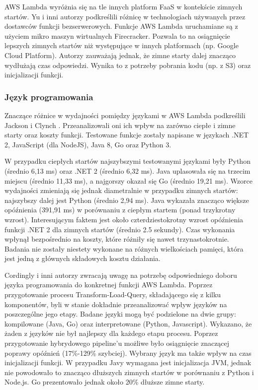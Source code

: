 AWS Lambda wyróżnia się na tle innych platform FaaS w kontekście zimnych startów.
Yu i inni autorzy \cite{10.1145/3419111.3421280} podkreślili różnicę w technologiach używanych przez dostawców funkcji bezserwerowych.
Funkcje AWS Lambda uruchamiane są z użyciem mikro maszyn wirtualnych Firecracker.
Pozwala to na osiągnięcie lepszych zimnych startów niż występujące w innych platformach (np. Google Cloud Platform).
Autorzy zauważają jednak, że zimne starty dalej znacząco wydłużają czas odpowiedzi.
Wynika to z potrzeby pobrania kodu (np. z S3) oraz inicjalizacji funkcji.

\subsubsection*{Język programowania}

Znaczące różnice w wydajności pomiędzy językami w AWS Lambda podkreślili Jackson i Clynch  \cite{8605773}. Przeanalizowali oni ich wpływ na zarówno ciepłe i zimne starty oraz koszty funkcji. Testowane funkcje zostały napisane w językach .NET 2, JavaScript (dla NodeJS), Java 8, Go oraz Python 3. 

W przypadku ciepłych startów najszybszymi testowanymi językami były Python (średnio 6,13 ms) oraz  .NET 2 (średnio 6,32 ms). 
Java uplasowała się na trzecim miejscu (średnio 11,33 ms), a najgorszy okazał się Go (średnio 19,21 ms). 
Wzorce wydajności zmieniają się jednak diametralnie w przypadku zimnych startów: najszybszy dalej jest Python (średnio 2,94 ms). 
Java wykazała znacząco większe opóźnienia (391,91 ms) w porównaniu z ciepłym startem (ponad trzykrotny wzrost). 
Interesującym faktem jest około czterdziestokrotny wzrost opóźnienia funkcji .NET 2 dla zimnych startów (średnio 2.5 sekundy). 
Czas wykonania wpłynął bezpośrednio na koszty, które różniły się nawet trzynastokrotnie. 
Badania nie zostały niestety wykonane na różnych wielkościach pamięci, która jest jedną z głównych składowych kosztu działania.

Cordingly i inni autorzy \cite{Cordingly2020704} zwracają uwagę na potrzebę odpowiedniego doboru języka programowania do konkretnej funkcji AWS Lambda. 
Poprzez przygotowanie procesu Transform-Load-Query, składającego się z kilku komponentów, byli w stanie dokładnie przeanalizować wpływ języków na poszczególne jego etapy. 
Badane języki mogą być podzielone na dwie grupy: kompilowane (Java, Go) oraz interpretowane (Python, Javascript). Wykazano, że żaden z języków nie był najlepszy dla każdego etapu procesu. 
Poprzez przygotowanie hybrydowego pipeline’u możliwe było osiągnięcie znaczącej poprawy opóźnień (17\%-129\% szybciej). Wybrany język ma także wpływ na czas inicjalizacji funkcji. 
W przypadku Javy wymagana jest inicjalizacja JVM, jednak nie powodowało to znacząco dłuższych zimnych startów w porównaniu z Python i Node.js. Go prezentowało jednak około 20\% dłuższe zimne starty.

